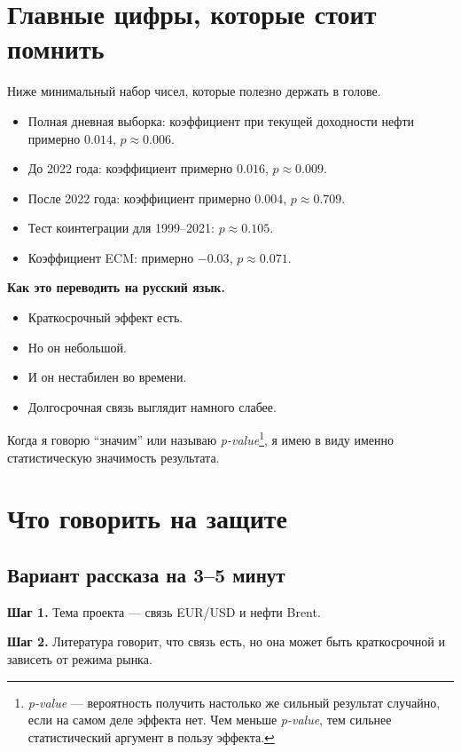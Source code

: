 \documentclass[a4paper,12pt]{article}
\begin{document}
\section{Главные цифры, которые стоит помнить}
Ниже минимальный набор чисел, которые полезно держать в голове.

\begin{itemize}
    \item Полная дневная выборка: коэффициент при текущей доходности нефти примерно $0.014$, $p \approx 0.006$.
    \item До 2022 года: коэффициент примерно $0.016$, $p \approx 0.009$.
    \item После 2022 года: коэффициент примерно $0.004$, $p \approx 0.709$.
    \item Тест коинтеграции для 1999--2021: $p \approx 0.105$.
    \item Коэффициент ECM: примерно $-0.03$, $p \approx 0.071$.
\end{itemize}

\textbf{Как это переводить на русский язык.}
\begin{itemize}
    \item Краткосрочный эффект есть.
    \item Но он небольшой.
    \item И он нестабилен во времени.
    \item Долгосрочная связь выглядит намного слабее.
\end{itemize}

Когда я говорю ``значим'' или называю \textit{p-value}\footnote{\textit{p-value} --- вероятность получить настолько же сильный результат случайно, если на самом деле эффекта нет. Чем меньше \textit{p-value}, тем сильнее статистический аргумент в пользу эффекта.}, я имею в виду именно статистическую значимость результата.

\section{Что говорить на защите}

\subsection{Вариант рассказа на 3--5 минут}
\textbf{Шаг 1.} Тема проекта --- связь EUR/USD и нефти Brent.

\textbf{Шаг 2.} Литература говорит, что связь есть, но она может быть краткосрочной и зависеть от режима рынка.
\end{document}
